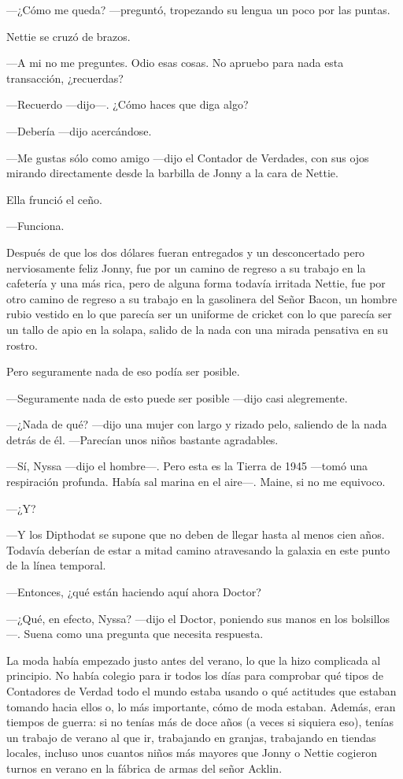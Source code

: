 ---¿Cómo me queda? ---preguntó, tropezando su lengua un poco por las
puntas.

Nettie se cruzó de brazos.

---A mi no me preguntes. Odio esas cosas. No apruebo para nada esta
transacción, ¿recuerdas?

---Recuerdo ---dijo---. ¿Cómo haces que diga algo?

---Debería ---dijo acercándose.

---Me gustas sólo como amigo ---dijo el Contador de Verdades, con sus
ojos mirando directamente desde la barbilla de Jonny a la cara de
Nettie.

Ella frunció el ceño.

---Funciona.

Después de que los dos dólares fueran entregados y un desconcertado pero
nerviosamente feliz Jonny, fue por un camino de regreso a su trabajo en
la cafetería y una más rica, pero de alguna forma todavía irritada
Nettie, fue por otro camino de regreso a su trabajo en la gasolinera del
Señor Bacon, un hombre rubio vestido en lo que parecía ser un uniforme
de cricket con lo que parecía ser un tallo de apio en la solapa, salido
de la nada con una mirada pensativa en su rostro.

Pero seguramente nada de eso podía ser posible.

---Seguramente nada de esto puede ser posible ---dijo casi alegremente.

---¿Nada de qué? ---dijo una mujer con largo y rizado pelo, saliendo de
la nada detrás de él. ---Parecían unos niños bastante agradables.

---Sí, Nyssa ---dijo el hombre---. Pero esta es la Tierra de 1945
---tomó una respiración profunda. Había sal marina en el aire---. Maine,
si no me equivoco.

---¿Y?

---Y los Dipthodat se supone que no deben de llegar hasta al menos cien
años. Todavía deberían de estar a mitad camino atravesando la galaxia en
este punto de la línea temporal.

---Entonces, ¿qué están haciendo aquí ahora Doctor?

---¿Qué, en efecto, Nyssa? ---dijo el Doctor, poniendo sus manos en los
bolsillos---. Suena como una pregunta que necesita respuesta.

La moda había empezado justo antes del verano, lo que la hizo complicada
al principio. No había colegio para ir todos los días para comprobar qué
tipos de Contadores de Verdad todo el mundo estaba usando o qué
actitudes que estaban tomando hacia ellos o, lo más importante, cómo de
moda estaban. Además, eran tiempos de guerra: si no tenías más de doce
años (a veces si siquiera eso), tenías un trabajo de verano al que ir,
trabajando en granjas, trabajando en tiendas locales, incluso unos
cuantos niños más mayores que Jonny o Nettie cogieron turnos en verano
en la fábrica de armas del señor Acklin.

